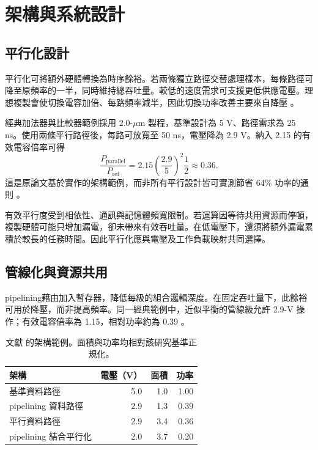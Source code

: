 \chapter{架構與系統設計}
\label{ch:architecture}
\section{平行化設計}
平行化可將額外硬體轉換為時序餘裕。若兩條獨立路徑交替處理樣本，每條路徑可降至原頻率的一半，同時維持總吞吐量。較低的速度需求可支援更低供應電壓。理想複製會使切換電容加倍、每路頻率減半，因此切換功率改善主要來自降壓 \cite{chandrakasan1992}。

經典加法器與比較器範例採用 2.0-$\mu$m 製程，基準設計為 5 V、路徑需求為 25 ns。使用兩條平行路徑後，每路可放寬至 50 ns，電壓降為 2.9 V。納入 2.15 的有效電容倍率可得
\begin{equation}
\frac{P_{\mathrm{parallel}}}{P_{\mathrm{ref}}}
=2.15\left(\frac{2.9}{5}\right)^2\frac{1}{2}\approx0.36.
\end{equation}
這是原論文基於實作的架構範例，而非所有平行設計皆可實測節省 64\% 功率的通則 \cite[Sec.~IV-E]{chandrakasan1992}。

有效平行度受到相依性、通訊與記憶體頻寬限制。若運算因等待共用資源而停頓，複製硬體可能只增加漏電，卻未帶來有效吞吐量。在低電壓下，還須將額外漏電累積於較長的任務時間。因此平行化應與電壓及工作負載映射共同選擇。

\section{管線化與資源共用}
 pipelining藉由加入暫存器，降低每級的組合邏輯深度。在固定吞吐量下，此餘裕可用於降壓，而非提高頻率。同一經典範例中，近似平衡的管線級允許 2.9-V 操作；有效電容倍率為 1.15，相對功率約為 0.39 \cite{chandrakasan1992}。

\begin{table}[htbp]
\centering\tablebegin
\caption{文獻 \cite[Table II]{chandrakasan1992} 的架構範例。面積與功率均相對該研究基準正規化。}
\begin{tabularx}{\textwidth}{@{}Yrrr@{}}
\toprule 架構 & 電壓（V） & 面積 & 功率 \\\midrule
基準資料路徑 & 5.0 & 1.0 & 1.00 \\
 pipelining 資料路徑 & 2.9 & 1.3 & 0.39 \\
平行資料路徑 & 2.9 & 3.4 & 0.36 \\
 pipelining 結合平行化 & 2.0 & 3.7 & 0.20 \\\bottomrule
\end{tabularx}
\end{table}

